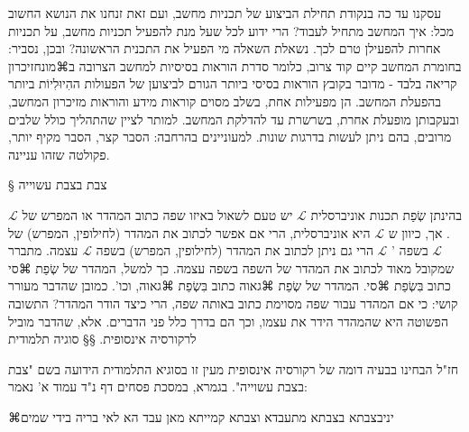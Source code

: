 {עסקנו עד כה בנקודת תחילת הביצוע של תכניות מחשב, ועם זאת זנחנו את הנושא החשוב מכל: איך המחשב מתחיל לעבוד? הרי ידוע לכל שעל מנת להפעיל תכניות מחשב, על תכניות אחרות להפעילן טרם לכך. נשאלת השאלה מי הפעיל את התכנית הראשונה? ובכן, נסביר: בחומרת המחשב קיים קוד צרוב, כלומר סדרת הוראות בסיסיות למחשב הצרובה ב⌘מונח{זיכרון קריאה בלבד} - מדובר בקובץ הוראות בסיסי ביותר הגורם לביצוען של הפעולות ההִיוּלִיוֹת ביותר בהפעלת המחשב. הן מפעילות אחת, בשלב מסוים קוראות מידע והוראות מזיכרון המחשב, ובעקבותן מופעלת אחרת, בשרשרת עד להדלקת המחשב. למותר לציין שהתהליך כולל שלבים מרובים, בהם ניתן לעשות בדרגות שונות. למעוניינים בהרחבה: הסבר קצר, הסבר מקיף יותר, פקולטה שזהו עניינה.



§ צבת בצבת עשוייה

בהינתן שְׂפַת תכנות אוניברסלית \(\mathcal{L}\) יש טעם לשאול באיזו שפה כתוב המהדר או המפרש של   \(\mathcal{L}\). אך, כיוון ש   \(\mathcal{L}\) היא אוניברסלית, הרי אם אפשר לכתוב את המהדר (לחילופין, המפרש) של   \(\mathcal{L}\) בשפה '  \(\mathcal{L}\) הרי גם ניתן לכתוב את המהדר (לחילופין, המפרש) בשפה   \(\mathcal{L}\) עצמה. 
מתברר שמקובל מאוד לכתוב את המהדר של השפה בשפה עצמה. כך למשל, המהדר של שְׂפַת ⌘סי כתוב בִּשְׂפַת ⌘סי. המהדר של שְׂפַת ⌘גאוה כתוב בִּשְׂפַת ⌘גאוה, וכו'. כמובן שהדבר מעורר קושי: כי אם המהדר עבור שפה מסוימת כתוב באותה שפה, הרי כיצד הודר המהדר? התשובה הפשוטה היא שהמהדר הידר את עצמו, וכך הם בדרך כלל פני הדברים. אלא, שהדבר מוביל לרקורסיה אינסופית.
​§§ סוגיה תלמודית

חז"ל הבחינו בבעיה דומה של רקורסיה אינסופית מעין זו בסוגיא התלמודית הידועה בשם "צבת בצבת עשוייה". בגמרא, במסכת פסחים דף נ"ד עמוד א' נאמר:


⌘יניב{צבתא בצבתא מתעבדא וצבתא קמייתא מאן עבד הא לאי בריה בידי שמים}


}
